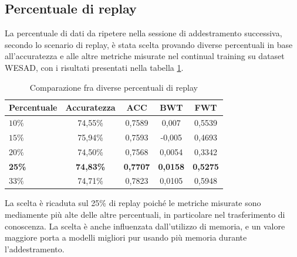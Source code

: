 \subsection{Percentuale di replay}
La percentuale di dati da ripetere nella sessione di addestramento successiva, secondo lo scenario di replay, è stata scelta provando diverse percentuali in base all'accuratezza e alle altre metriche misurate nel continual training su dataset WESAD, con i risultati presentati nella tabella \ref{tab:replayperctest}.\\
\begin{table}[h]
    \begin{center}
        \begin{tabular}{l|c|c|c|c}
            \textbf{Percentuale} & \textbf{Accuratezza} & \textbf{ACC} & \textbf{BWT} & \textbf{FWT}\\
            \hline
            $10\%$ & 74,55\% & 0,7589 & 0,007 & 0,5539\\
            $15\%$ & 75,94\% & 0,7593 & -0,005 & 0,4693\\
            $20\%$ & 74,50\% & 0,7568 & 0,0054 & 0,3342\\
            \textbf{25\%} & \textbf{74,83\%} & \textbf{0,7707} & \textbf{0,0158} & \textbf{0,5275}\\
            $33\%$ & 74,71\% & 0,7823 & 0,0105 & 0,5948\\
        \end{tabular}
        \caption{Comparazione fra diverse percentuali di replay}
        \label{tab:replayperctest}
    \end{center}
\end{table}
La scelta è ricaduta sul 25\% di replay poiché le metriche misurate sono mediamente più alte delle altre percentuali, in particolare nel trasferimento di conoscenza. La scelta è anche influenzata dall'utilizzo di memoria, e un valore maggiore porta a modelli migliori pur usando più memoria durante l'addestramento.
\pagebreak
